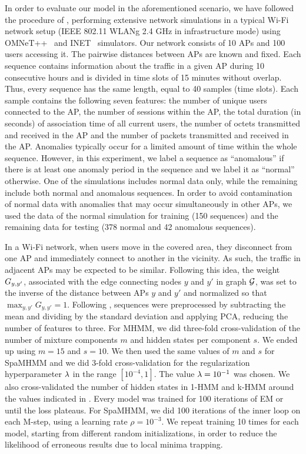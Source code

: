In order to evaluate our model in the aforementioned scenario, we have followed the procedure of \citet{Anisa2017}, performing extensive network simulations in a typical Wi-Fi network setup (IEEE 802.11 WLANg 2.4 GHz in infrastructure mode) using OMNeT++~\cite{omnetpp} and INET~\cite{inet} simulators. Our network consists of 10 APs and 100 users accessing it. The pairwise distances between APs are known and fixed. Each sequence contains information about the traffic in a given AP during 10 consecutive hours and is divided in time slots of 15 minutes without overlap. Thus, every sequence has the same length, equal to 40 samples (time slots). Each sample contains the following seven features: the number of unique users connected to the AP, the number of sessions within the AP, the total duration (in seconds) of association time of all current users, the number of octets transmitted and received in the AP and the number of packets transmitted and received in the AP. Anomalies typically occur for a limited amount of time within the whole sequence. However, in this experiment, we label a sequence as ``anomalous'' if there is at least one anomaly period in the sequence and we label it as ``normal'' otherwise. One of the simulations includes normal data only, while the remaining include both normal and anomalous sequences. In order to avoid contamination of normal data with anomalies that may occur simultaneously in other APs, we used the data of the normal simulation for training (150 sequences) and the remaining data for testing (378 normal and 42 anomalous sequences).

In a Wi-Fi network, when users move in the covered area, they disconnect from one AP and immediately connect to another in the vicinity. As such, the traffic in adjacent APs may be expected to be similar. Following this idea, the weight ${G}_{y,y'}$, associated with the edge connecting nodes $y$ and $y'$ in graph ${\mathcal{G}}$, was set to the inverse of the distance between APs $y$ and $y'$ and normalized so that $\max_{y,y'} G_{y,y'}=1$. Following \citet{Anisa2017}, sequences were preprocessed by subtracting the mean and dividing by the standard deviation and applying PCA, reducing the number of features to three. For MHMM, we did three-fold cross-validation of the number of mixture components $m$ and hidden states per component $s$. We ended up using $m=15$ and $s=10$. We then used the same values of $m$ and $s$ for SpaMHMM and we did 3-fold cross-validation for the regularization hyperparameter $\lambda$ in the range $[10^{-4}, 1]$. The value $\lambda=10^{-1}$ was chosen. We also cross-validated the number of hidden states in 1-HMM and k-HMM around the values indicated in . Every model was trained for 100 iterations of EM or until the loss plateaus. For SpaMHMM, we did 100 iterations of the inner loop on each M-step, using a learning rate $\rho=10^{-3}$. We repeat training 10 times for each model, starting from different random initializations, in order to reduce the likelihood of erroneous results due to local minima trapping.

